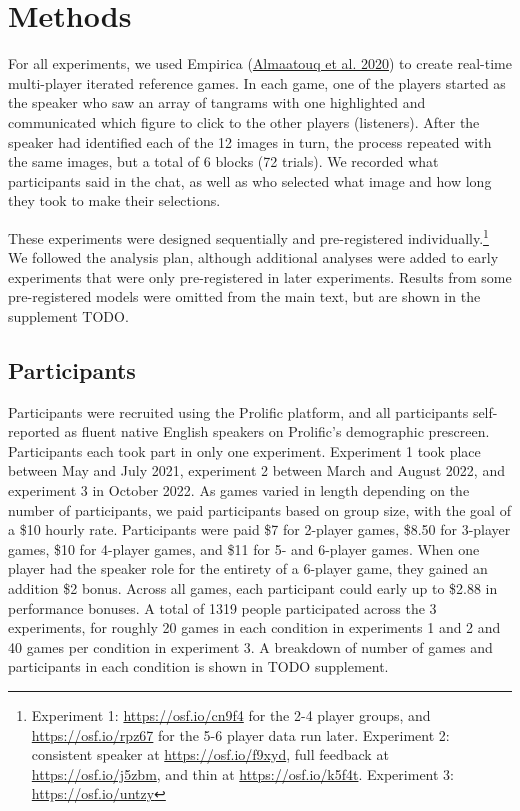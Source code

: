 \documentclass[
  english,
  a4paper,
]{article}
\begin{document}
\hypertarget{methods}{%
\section{Methods}\label{methods}}

For all experiments, we used Empirica (\protect\hyperlink{ref-almaatouq2020}{Almaatouq et al. 2020}) to create real-time multi-player iterated reference games. In each game, one of the players started as the speaker who saw an array of tangrams with one highlighted and communicated which figure to click to the other players (listeners). After the speaker had identified each of the 12 images in turn, the process repeated with the same images, but a total of 6 blocks (72 trials). We recorded what participants said in the chat, as well as who selected what image and how long they took to make their selections.

These experiments were designed sequentially and pre-registered individually.\footnote{Experiment 1: \url{https://osf.io/cn9f4} for the 2-4 player groups, and \url{https://osf.io/rpz67} for the 5-6 player data run later. Experiment 2: consistent speaker at \url{https://osf.io/f9xyd}, full feedback at \url{https://osf.io/j5zbm}, and thin at \url{https://osf.io/k5f4t}. Experiment 3: \url{https://osf.io/untzy}} We followed the analysis plan, although additional analyses were added to early experiments that were only pre-registered in later experiments. Results from some pre-registered models were omitted from the main text, but are shown in the supplement TODO.

\hypertarget{participants}{%
\subsection{Participants}\label{participants}}

Participants were recruited using the Prolific platform, and all participants self-reported as fluent native English speakers on Prolific's demographic prescreen. Participants each took part in only one experiment. Experiment 1 took place between May and July 2021, experiment 2 between March and August 2022, and experiment 3 in October 2022. As games varied in length depending on the number of participants, we paid participants based on group size, with the goal of a \$10 hourly rate. Participants were paid \$7 for 2-player games, \$8.50 for 3-player games, \$10 for 4-player games, and \$11 for 5- and 6-player games. When one player had the speaker role for the entirety of a 6-player game, they gained an addition \$2 bonus. Across all games, each participant could early up to \$2.88 in performance bonuses. A total of 1319 people participated across the 3 experiments, for roughly 20 games in each condition in experiments 1 and 2 and 40 games per condition in experiment 3. A breakdown of number of games and participants in each condition is shown in TODO supplement.
\end{document}
